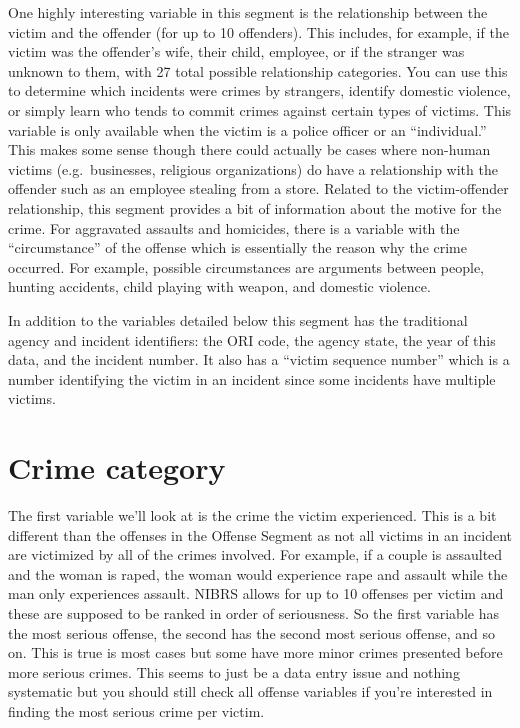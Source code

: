 \documentclass[
]{krantz}
\begin{document}
One highly interesting variable in this segment is the
relationship between the victim and the offender (for up to
10 offenders). This includes, for example, if the victim was
the offender's wife, their child, employee, or if the
stranger was unknown to them, with 27 total possible
relationship categories. You can use this to determine which
incidents were crimes by strangers, identify domestic
violence, or simply learn who tends to commit crimes against
certain types of victims. This variable is only available
when the victim is a police officer or an ``individual.''
This makes some sense though there could actually be cases
where non-human victims (e.g.~businesses, religious
organizations) do have a relationship with the offender such
as an employee stealing from a store. Related to the
victim-offender relationship, this segment provides a bit of
information about the motive for the crime. For aggravated
assaults and homicides, there is a variable with the
``circumstance'' of the offense which is essentially the
reason why the crime occurred. For example, possible
circumstances are arguments between people, hunting
accidents, child playing with weapon, and domestic violence.

In addition to the variables detailed below this segment has
the traditional agency and incident identifiers: the ORI
code, the agency state, the year of this data, and the
incident number. It also has a ``victim sequence number''
which is a number identifying the victim in an incident
since some incidents have multiple victims.

\section{Crime category}\label{crime-category-1}

The first variable we'll look at is the crime the victim
experienced. This is a bit different than the offenses in
the Offense Segment as not all victims in an incident are
victimized by all of the crimes involved. For example, if a
couple is assaulted and the woman is raped, the woman would
experience rape and assault while the man only experiences
assault. NIBRS allows for up to 10 offenses per victim and
these are supposed to be ranked in order of seriousness. So
the first variable has the most serious offense, the second
has the second most serious offense, and so on. This is true
is most cases but some have more minor crimes presented
before more serious crimes. This seems to just be a data
entry issue and nothing systematic but you should still
check all offense variables if you're interested in finding
the most serious crime per victim.
\end{document}
